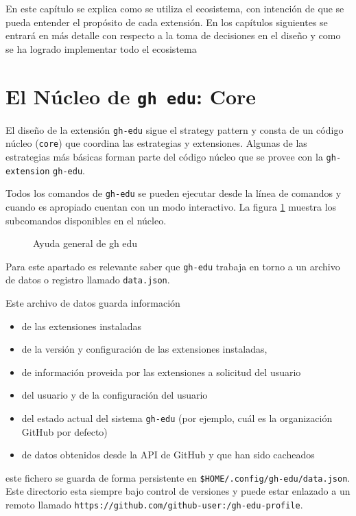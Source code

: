 En este capítulo se explica como se utiliza el ecosistema, con intención de que se pueda entender el propósito de cada extensión. En los capítulos siguientes se entrará en más detalle con respecto a la toma de decisiones en el diseño y como se ha logrado implementar todo el ecosistema 

\section{El Núcleo de {\tt gh edu}: Core}

El diseño de la extensión \verb|gh-edu| sigue el \gls{strategy pattern} y consta de un código núcleo (\verb|core|) que coordina las estrategias y extensiones. Algunas de las estrategias más básicas forman parte del código núcleo que se provee con la \verb|gh-extension| \verb|gh-edu|.

Todos los comandos de \verb|gh-edu|  se pueden ejecutar desde la línea de comandos y cuando es apropiado cuentan con un modo interactivo. La figura \ref{fig:ghEduHelp} muestra los subcomandos disponibles en el núcleo.

\begin{figure}[h]
    \centering
    \caption{Ayuda general de gh edu}
    \label{fig:ghEduHelp}
\end{figure}

Para este apartado es relevante saber que \verb|gh-edu| trabaja en torno a un archivo de datos o registro llamado \verb|data.json|.

Este archivo de datos guarda información
\begin{itemize}
    \item de las extensiones instaladas 
    \item de la versión y configuración de las extensiones instaladas,
    \item de información proveida por las extensiones a solicitud del usuario
    \item del usuario y de la configuración del usuario 
    \item del estado actual del sistema \verb|gh-edu| (por ejemplo, cuál es la organización GitHub por defecto)
    \item de datos obtenidos desde la API de GitHub y que han sido cacheados
\end{itemize}
 este fichero se guarda de forma persistente en \verb|$HOME/.config/gh-edu/data.json|. Este directorio esta siempre bajo control de versiones y puede estar enlazado a un remoto llamado \verb|https://github.com/github-user:/gh-edu-profile|.

